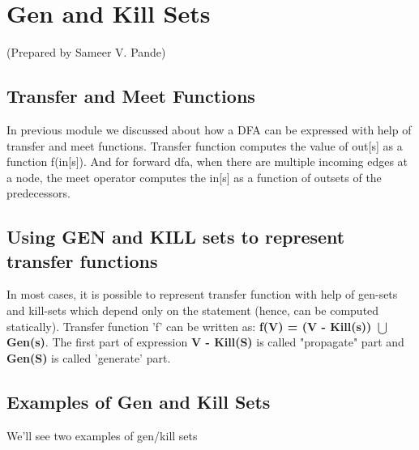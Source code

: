 \section {Gen and Kill Sets}
\setlength{\parindent}{0pt}

(Prepared by Sameer V. Pande)

\vspace{0.3cm}

\subsection{Transfer and Meet Functions}
In previous module we discussed about how a DFA can be expressed with help of transfer and meet functions.
Transfer function computes the value of out[s] as a function f(in[s]). And for forward dfa, when there are multiple incoming edges at a node,
the meet operator computes the in[s] as a function of outsets of the predecessors.

\subsection{Using GEN and KILL sets to represent transfer functions}
In most cases, it is possible to represent transfer function with help of gen-sets and kill-sets which depend only on the statement (hence, can be computed statically).
Transfer function 'f' can be written as: \textbf{f(V) = (V - Kill(s)) $\bigcup$ Gen(s)}. The first part of expression
\textbf{ V - Kill(S)} is called "propagate" part and \textbf{Gen(S)} is called 'generate' part.

\subsection{Examples of Gen and Kill Sets}
We'll see two examples of gen/kill sets 
